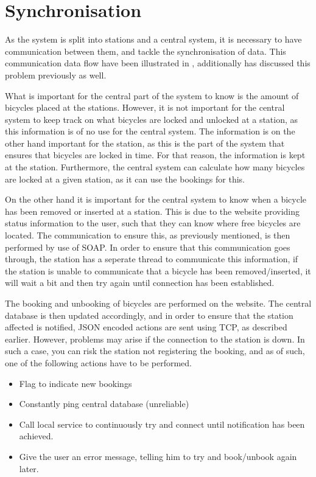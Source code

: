 \section{Synchronisation}\label{sec:implsync}
As the system is split into stations and a central system, it is necessary to have communication between them, and tackle the synchronisation of data.
This communication data flow have been illustrated in , additionally  has discussed this problem previously as well.

\begin{description}[style=nextline]
	\item[Bicycle locking/unlocking not synchronised]
	What is important for the central part of the system to know is the amount of bicycles placed at the stations.
	However, it is not important for the central system to keep track on what bicycles are locked and unlocked at a station, as this information is of no use for the central system.
	The information is on the other hand important for the station, as this is the part of the system that ensures that bicycles are locked in time.
	For that reason, the information is kept at the station. Furthermore, the central system can calculate how many bicycles are locked at a given station, as it can use the bookings for this.
	
	\item[Removal/Insertion of bicycles]
	On the other hand it is important for the central system to know when a bicycle has been removed or inserted at a station.
	This is due to the website providing status information to the user, such that they can know where free bicycles are located.
	The communication to ensure this, as previously mentioned, is then performed by use of SOAP.
	In order to ensure that this communication goes through, the station has a seperate thread to communicate this information, if the station is unable to communicate that a bicycle has been removed/inserted, it will wait a bit and then try again until connection has been established.
	
	\item[Booking/Unbooking]
	The booking and unbooking of bicycles are performed on the website. 
	The central database is then updated accordingly, and in order to ensure that the station affected is notified, JSON encoded actions are sent using TCP, as described earlier.
	However, problems may arise if the connection to the station is down.
	In such a case, you can risk the station not registering the booking, and as of such, one of the following actions have to be performed.
	\begin{itemize}
		\item Flag to indicate new bookings
		\item Constantly ping central database (unreliable)
		\item Call local service to continuously try and connect until notification has been achieved.
		\item Give the user an error message, telling him to try and book/unbook again later. 
	\end{itemize}
	

\end{description}
